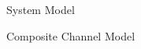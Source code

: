 \documentclass{IEEEtran}
\begin{document}
\begin{section} {System Model}
	\begin{subsection} {Composite Channel Model}


\end{subsection}
\end{section}
\end{document}
